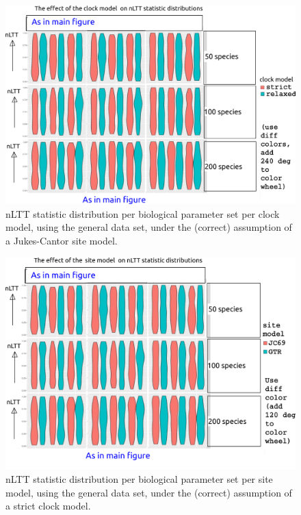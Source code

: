 \documentclass{article}
\begin{document}
\begin{figure}[!htbp]
  \includegraphics[width=\textwidth]{fig_clock_model.png}
  \caption{
    nLTT statistic distribution per biological parameter set per clock model,
    using the general data set, 
    under the (correct) assumption of a Jukes-Cantor site model.
  }
\end{figure}

\begin{figure}[!htbp]
  \includegraphics[width=\textwidth]{fig_site_model.png}
  \caption{
    nLTT statistic distribution per biological parameter set per site model,
    using the general data set, 
    under the (correct) assumption of a strict clock model.
  }
\end{figure}
\end{document}
